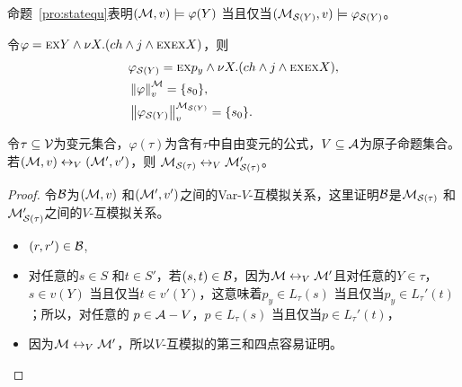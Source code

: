 命题~\ref{pro:statequ}表明$({\cal M}, v) \models \varphi(Y)$ 当且仅当$({\cal M}_{{\cal S}(Y)}, v) \models \varphi_{{\cal S}(Y)}$。 %
\begin{example}
	令$\varphi = \textsc{e}\textsc{x} Y \wedge \nu X. (ch \wedge j \wedge \textsc{e}\textsc{x} \textsc{e} \textsc{x} X)$，则 
	\begin{align*}
		&\varphi_{{\cal S}(Y)} = \textsc{e}\textsc{x} p_y \wedge \nu X. (ch \wedge j \wedge \textsc{e}\textsc{x} \textsc{e} \textsc{x} X),\\
		&\left\|\varphi\right\|_v^{{\cal M}} = \{s_0\},\\
		&\left\|\varphi_{{\cal S}(Y)}\right\|_v^{{\cal M}_{{\cal S}(Y)}} = \{s_0\}.
	\end{align*}
\end{example}

\begin{lemma}
	\label{lem:vbextension}
	令$\tau \subseteq {\cal V}$为变元集合，$\varphi(\tau)$为含有$\tau$中自由变元的公式，$V\subseteq {\cal A}$为原子命题集合。若$({\cal M}, v) \leftrightarrow_V ({\cal M}',v')$，则 ${\cal M}_{{\cal S}(\tau)} \leftrightarrow_V {\cal M}'_{{\cal S}(\tau)}$。
\end{lemma}
\begin{proof}
	令${\cal B}$为$({\cal M}, v)$ 和$({\cal M}',v')$之间的Var-$V$-互模拟关系，这里证明${\cal B}$是${\cal M}_{{\cal S}(\tau)}$ 和${\cal M}'_{{\cal S}(\tau)}$之间的$V$-互模拟关系。
	\begin{itemize}
		\item $(r,r')\in {\cal B}$,
		\item 对任意的$s\in S$ 和$t\in S'$，若$(s,t)\in {\cal B}$，因为${\cal M} \leftrightarrow_V {\cal M}'$且对任意的$Y\in \tau$，$s\in v(Y)$ 当且仅当$t \in v'(Y)$，这意味着$p_y\in L_{\tau}(s)$ 当且仅当$p_y \in  L_{\tau}'(t)$；所以，对任意的 $p\in {\cal A}-V$，$p\in L_{\tau}(s)$ 当且仅当$p\in L_{\tau}'(t)$， %
		\item 因为${\cal M} \leftrightarrow_V {\cal M}'$，所以$V$-互模拟的第三和四点容易证明。
	\end{itemize}
\end{proof}

